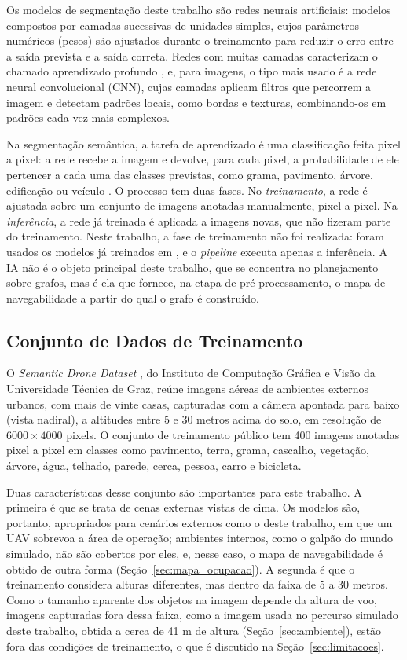 \documentclass[
    12pt,
    openright,
    oneside,
    a4paper,
    english,
    brazil
]{abntex2}
\begin{document}
Os modelos de segmentação deste trabalho são redes neurais artificiais: modelos compostos por camadas sucessivas de unidades simples, cujos parâmetros numéricos (pesos) são ajustados durante o treinamento para reduzir o erro entre a saída prevista e a saída correta. Redes com muitas camadas caracterizam o chamado aprendizado profundo \cite{goodfellow2016, lecun2015}, e, para imagens, o tipo mais usado é a rede neural convolucional (CNN), cujas camadas aplicam filtros que percorrem a imagem e detectam padrões locais, como bordas e texturas, combinando-os em padrões cada vez mais complexos.

Na segmentação semântica, a tarefa de aprendizado é uma classificação feita pixel a pixel: a rede recebe a imagem e devolve, para cada pixel, a probabilidade de ele pertencer a cada uma das classes previstas, como grama, pavimento, árvore, edificação ou veículo \cite{long2015}. O processo tem duas fases. No \emph{treinamento}, a rede é ajustada sobre um conjunto de imagens anotadas manualmente, pixel a pixel. Na \emph{inferência}, a rede já treinada é aplicada a imagens novas, que não fizeram parte do treinamento. Neste trabalho, a fase de treinamento não foi realizada: foram usados os modelos já treinados em \cite{junior2024_models}, e o \textit{pipeline} executa apenas a inferência. A IA não é o objeto principal deste trabalho, que se concentra no planejamento sobre grafos, mas é ela que fornece, na etapa de pré-processamento, o mapa de navegabilidade a partir do qual o grafo é construído.

\subsection{Conjunto de Dados de Treinamento}
\label{sec:sdd}

O \emph{Semantic Drone Dataset} \cite{drone_dataset}, do Instituto de Computação Gráfica e Visão da Universidade Técnica de Graz, reúne imagens aéreas de ambientes externos urbanos, com mais de vinte casas, capturadas com a câmera apontada para baixo (vista nadiral), a altitudes entre 5 e 30 metros acima do solo, em resolução de $6000 \times 4000$ pixels. O conjunto de treinamento público tem 400 imagens anotadas pixel a pixel em classes como pavimento, terra, grama, cascalho, vegetação, árvore, água, telhado, parede, cerca, pessoa, carro e bicicleta.

Duas características desse conjunto são importantes para este trabalho. A primeira é que se trata de cenas externas vistas de cima. Os modelos são, portanto, apropriados para cenários externos como o deste trabalho, em que um UAV sobrevoa a área de operação; ambientes internos, como o galpão do mundo simulado, não são cobertos por eles, e, nesse caso, o mapa de navegabilidade é obtido de outra forma (Seção~\ref{sec:mapa_ocupacao}). A segunda é que o treinamento considera alturas diferentes, mas dentro da faixa de 5 a 30 metros. Como o tamanho aparente dos objetos na imagem depende da altura de voo, imagens capturadas fora dessa faixa, como a imagem usada no percurso simulado deste trabalho, obtida a cerca de 41 m de altura (Seção~\ref{sec:ambiente}), estão fora das condições de treinamento, o que é discutido na Seção~\ref{sec:limitacoes}.
\end{document}

